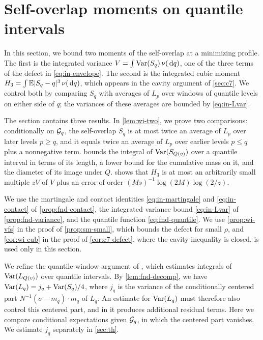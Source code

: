 \chapter{Self-overlap moments on quantile intervals}\label{sec:wi}

In this section, we bound two moments of the self-overlap at a
minimizing profile. The first is the integrated variance
$V=\int\operatorname{Var}(S_q)\,\nu(\,\mathrm d q)$, one of the three terms of the defect in
\eqref{eq:in-envelope}. The second is the integrated cubic moment
$H_3=\int\mathbb E|S_q-q|^3\,\nu(\,\mathrm d q)$, which appears in the cavity argument
of \cref{sec:c7}. We control both by comparing $S_q$ with averages of
$L_p$ over windows of quantile levels on either side of $q$; the
variances of these averages are bounded by \eqref{eq:in-Lvar}.

The section contains three results. In \cref{lem:wi-two}, we prove two
comparisons: conditionally on $\mathcal G_q$, the self-overlap $S_q$ is at
most twice an average of $L_p$ over later levels $p\ge q$, and it equals
twice an average of $L_p$ over earlier levels $p\le q$ plus a
nonnegative term.  bounds the integral of
$\operatorname{Var}(S_{Q(v)})$ over a quantile interval in terms of its length, a
lower bound for the cumulative mass on it, and the diameter of its image
under $Q$.  shows that $H_3$ is at most an arbitrarily
small multiple $zV$ of $V$ plus an error of order
$(Ms)^{-1}\log(2M)\log(2/z)$.

We use the martingale and contact identities \eqref{eq:in-martingale}
and \eqref{eq:in-contact} of \cref{prop:fnd-contact}, the integrated
variance bound \eqref{eq:in-Lvar} of \cref{prop:fnd-variance}, and the
quantile function \eqref{eq:fnd-quantile}. We use \cref{prop:wi-vfs} in
the proof of \cref{prop:sm-small}, which bounds the defect for small
$\rho$, and \cref{cor:wi-cub} in the proof of \cref{cor:c7-defect},
where the cavity inequality is closed.  is used only in
this section.

We refine the quantile-window argument of \cite[Lemma~3.3]{AL}, which
estimates integrals of $\operatorname{Var}(L_{Q(v)})$ over quantile intervals.
By \cref{lem:fnd-decomp}, we have $\operatorname{Var}(L_q)=j_q+\operatorname{Var}(S_q)/4$, where
$j_q$ is the variance of the conditionally centered part $N^{-1}(\sigma-m_q)\cdot m_q$ of $L_q$. An
estimate for $\operatorname{Var}(L_q)$ must therefore also control this centered part,
and in \cite[Lemma~3.3]{AL} it produces additional residual terms. Here
we compare conditional expectations given $\mathcal G_q$, in which the
centered part vanishes. We estimate $j_q$ separately in \cref{sec:th}.

